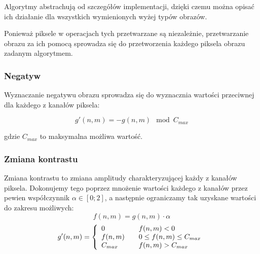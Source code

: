 \documentclass{classrep}
\begin{document}
Algorytmy abstrachują od szczegółów implementacji, dzięki czemu można opisać ich działanie dla wszystkich wymienionych wyżej typów obrazów.

Ponieważ piksele w operacjach tych przetwarzane są niezależnie, przetwarzanie obrazu za ich pomocą sprowadza się do przetworzenia każdego piksela obrazu zadanym algorytmem.

\subsubsection{Negatyw}
\label{filter.negative}
Wyznaczanie negatywu obrazu sprowadza się do wyznacznia wartości przeciwnej dla każdego z kanałów piksela:

\begin{equation}
 g'(n, m) = -g(n, m) \mod C_{max}
\end{equation}

gdzie $C_{max}$ to maksymalna możliwa wartość.

\subsubsection{Zmiana kontrastu}
\label{filter.contrast}
Zmiana kontrastu to zmiana amplitudy charakteryzującej każdy z kanałów piksela. Dokonujemy tego poprzez mnożenie wartości każdego z kanałów przez pewien współczynnik $\alpha \in [0; 2]$, a następnie ograniczamy tak uzyskane wartości do zakresu możliwych:
\begin{equation}
\label{eq.contrast}
 f(n, m) = g(n, m) \cdot \alpha
\end{equation}
\begin{equation}
 g'(n, m) = \left\{
  \begin{array}{l l}
    0 & \quad f(n, m) < 0 \\
    f(n, m) & \quad 0 \leq f(n, m) \leq C_{max} \\
    C_{max} & \quad f(n, m) > C_{max} \\
  \end{array}
\right.
\end{equation}
\end{document}
